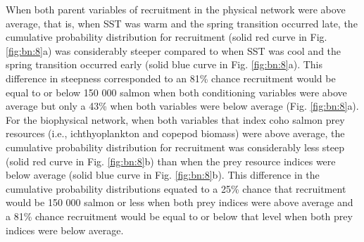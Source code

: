 When both parent variables of recruitment in the physical network were above
average, that is, when SST was warm and the spring transition occurred late, the
cumulative probability distribution for recruitment (solid red curve in Fig.
\ref{fig:bn:8}a) was considerably steeper compared to when SST was cool and the
spring transition occurred early (solid blue curve in Fig. \ref{fig:bn:8}a).
This difference in steepness corresponded to an 81\% chance recruitment would be
equal to or below 150 000 salmon when both conditioning variables were above
average but only a 43\% when both variables were below average (Fig.
\ref{fig:bn:8}a). For the biophysical network, when both variables that index
coho salmon prey resources (i.e., ichthyoplankton and copepod biomass) were
above average, the cumulative probability distribution for recruitment was
considerably less steep (solid red curve in Fig. \ref{fig:bn:8}b) than when the
prey resource indices were below average (solid blue curve in Fig.
\ref{fig:bn:8}b). This difference in the cumulative probability distributions
equated to a 25\% chance that recruitment would be 150 000 salmon or less when
both prey indices were above average and a 81\% chance recruitment would be
equal to or below that level when both prey indices were below average.

